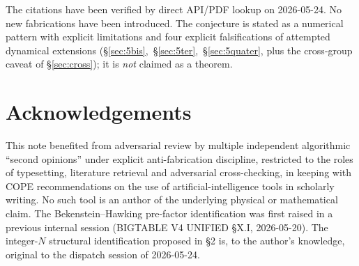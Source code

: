 \documentclass[11pt,a4paper]{article}
\theoremstyle{plain}
\begin{document}
The citations \cite{Heegner1952,Stark1967,Planck2018,Tristram2024,DESI2024,Riess2022,nEDM2020,PecceiQuinn1977} have been verified by direct API/PDF lookup on 2026-05-24. No new fabrications have been introduced. The conjecture is stated as a numerical pattern with explicit limitations and four explicit falsifications of attempted dynamical extensions (\S\ref{sec:5bis},~\S\ref{sec:5ter},~\S\ref{sec:5quater}, plus the cross-group caveat of \S\ref{sec:cross}); it is \emph{not} claimed as a theorem.

\section*{Acknowledgements}

This note benefited from adversarial review by multiple independent algorithmic ``second opinions'' under explicit anti-fabrication discipline, restricted to the roles of typesetting, literature retrieval and adversarial cross-checking, in keeping with COPE recommendations on the use of artificial-intelligence tools in scholarly writing. No such tool is an author of the underlying physical or mathematical claim. The Bekenstein--Hawking pre-factor identification was first raised in a previous internal session (BIGTABLE V4 UNIFIED \S X.I, 2026-05-20). The integer-$N$ structural identification proposed in \S2 is, to the author's knowledge, original to the dispatch session of 2026-05-24.
\end{document}
